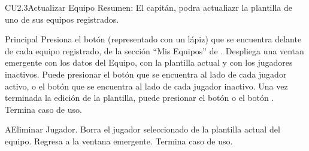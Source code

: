 

	\begin{UseCase}{CU2.3}{Actualizar Equipo}{
		Resumen: El capitán, podra actualiazr la plantilla de uno de sus equipos registrados.}
	\end{UseCase}
	\newpage
	
	\begin{UCtrayectoria}{Principal}
	\UCpaso[\UCactor] Presiona el botón  (representado con un lápiz) que se encuentra delante de cada equipo registrado, de la sección ``Mis Equipos'' de .
	\UCpaso Despliega una ventan emergente con los datos del Equipo, con la plantilla actual y con los jugadores inactivos.
	\UCpaso[\UCactor]Puede presionar el botón   que se encuentra al lado de cada jugador activo, o el botón \IUbutton{+}  que se encuentra al lado de cada jugador inactivo.
	\UCpaso[\UCactor] Una vez terminada la edición de la plantilla, puede presionar el botón   o el botón  .
	\UCpaso Termina caso de uso.
\end{UCtrayectoria}
	
	\begin{UCtrayectoriaA}{A}{Eliminar Jugador.}
		\UCpaso Borra el jugador seleccionado de la plantilla actual del equipo.
		\UCpaso Regresa a la ventana emergente.
		\UCpaso Termina caso de uso.
	\end{UCtrayectoriaA}
	
